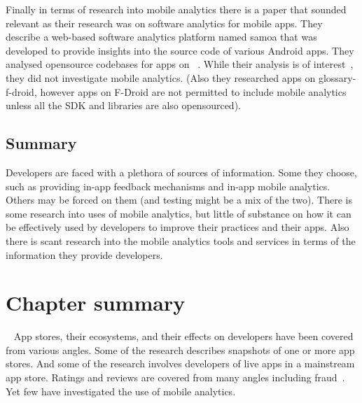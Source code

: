 Finally in terms of research into mobile analytics there is a paper that sounded relevant as their research was on software analytics for mobile apps. They describe a web-based software analytics platform named \Gls{samoa} that was developed to provide insights into the source code of various Android apps. They analysed opensource codebases for apps on ~. While their analysis is of interest~, they did not investigate mobile analytics. (Also they researched apps on \Gls{glossary-f-droid}, however apps on F-Droid are not permitted to include mobile analytics unless all the SDK and libraries are also opensourced).

\subsection{Summary} %
Developers are faced with a plethora of sources of information. Some they choose, such as providing in-app feedback mechanisms and in-app mobile analytics. Others may be forced on them (and testing might be a mix of the two). There is some research into uses of mobile analytics, but little of substance on how it can be effectively used by developers to improve their practices and their apps. Also there is scant research into the mobile analytics tools and services in terms of the information they provide developers.

\section{Chapter summary}~\label{rw-summary-section}
App stores, their ecosystems, and their effects on developers have been covered from various angles. Some of the research describes snapshots of one or more app stores. And some of the research involves developers of live apps in a mainstream app store. Ratings and reviews are covered from many angles including fraud~. Yet few have investigated the use of mobile analytics.

